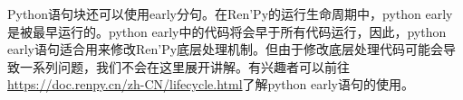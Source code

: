\begin{ExtraKnowledge}
    Python语句块还可以使用early分句。在Ren'Py的运行生命周期中，python early是被最早运行的。python early中的代码将会早于所有代码运行，因此，python early语句适合用来修改Ren'Py底层处理机制。但由于修改底层处理代码可能会导致一系列问题，我们不会在这里展开讲解。有兴趣者可以前往\url{https://doc.renpy.cn/zh-CN/lifecycle.html}了解python early语句的使用。
\end{ExtraKnowledge}

